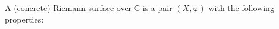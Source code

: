 A (concrete) Riemann surface over $\mathbb{C}$ is a pair $(X, \varphi)$ with the following properties:
